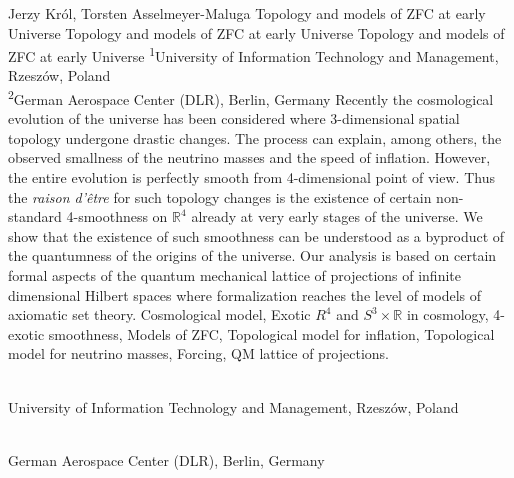 \begin{artengenv2auth}{Jerzy Kr\'ol, Torsten Asselmeyer-Maluga}
	{Topology and models of ZFC at early Universe}
	{Topology and models of ZFC at early Universe}
	{Topology and models of ZFC at early Universe}
	{\textsuperscript{1}University of Information Technology and Management, Rzesz\'ow, Poland\\
		\textsuperscript{2}German Aerospace Center (DLR), Berlin, Germany}
	{Recently the cosmological evolution of the universe has been considered where 3-dimensional spatial topology undergone drastic changes. The process can explain, among others, the observed smallness of the neutrino masses and the speed of inflation. However, the entire evolution is perfectly smooth from 4-dimensional point of view. Thus the \textit{raison d'{\^e}tre} for such topology changes is the existence of certain non-standard 4-smoothness on $\mathbb{R}^4$ already at very early stages of the universe. 
		We show that the existence of such smoothness can be understood as a byproduct of the quantumness of the origins of the universe. Our analysis is based on certain formal aspects of the quantum mechanical lattice of projections of infinite dimensional Hilbert spaces where formalization reaches the level of models of axiomatic set theory. }
	{Cosmological model, Exotic $R^4$ and $S^3 \times \mathbb{R}$ in cosmology, 4-exotic smoothness, Models of ZFC, Topological model for inflation, Topological model for neutrino masses, Forcing, QM lattice of projections.}
	{%
		{\flushright{}\\\subsubsectit\small{University of Information Technology and Management, Rzesz\'ow, Poland}\par}%
		{\flushright{}\\\subsubsectit\small{German Aerospace Center (DLR), Berlin, Germany}\par}%
	}










\end{artengenv2auth}
